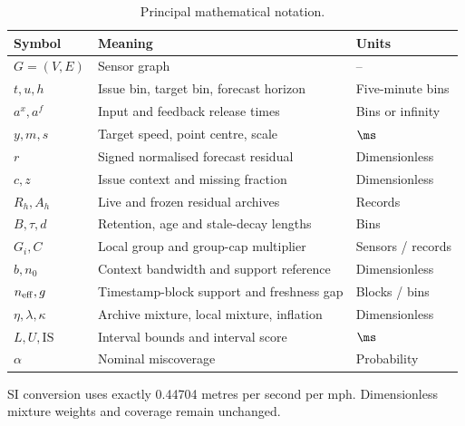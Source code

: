 \begin{table}[p]
\caption{Principal mathematical notation.}\label{tab:notation}
\centering\small
\begin{tabular}{lll}\toprule
Symbol & Meaning & Units \\\midrule
$G=(V,E)$ & Sensor graph & -- \\
$t,u,h$ & Issue bin, target bin, forecast horizon & Five-minute bins \\
$a^x,a^f$ & Input and feedback release times & Bins or infinity \\
$y,m,s$ & Target speed, point centre, scale & $\ms$ \\
$r$ & Signed normalised forecast residual & Dimensionless \\
$c,z$ & Issue context and missing fraction & Dimensionless \\
$R_h,A_h$ & Live and frozen residual archives & Records \\
$B,\tau,d$ & Retention, age and stale-decay lengths & Bins \\
$G_i,C$ & Local group and group-cap multiplier & Sensors / records \\
$b,n_0$ & Context bandwidth and support reference & Dimensionless \\
$n_{\rm eff},g$ & Timestamp-block support and freshness gap & Blocks / bins \\
$\eta,\lambda,\kappa$ & Archive mixture, local mixture, inflation & Dimensionless \\
$L,U,\mathrm{IS}$ & Interval bounds and interval score & $\ms$ \\
$\alpha$ & Nominal miscoverage & Probability \\
\bottomrule\end{tabular}
\par\smallskip\footnotesize SI conversion uses exactly 0.44704 metres per second per mph. Dimensionless mixture weights and coverage remain unchanged.
\end{table}\clearpage
